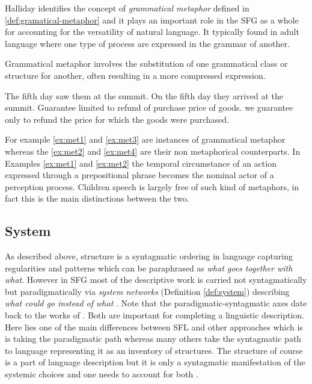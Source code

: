 Halliday identifies the concept of \textit{grammatical metaphor} defined in \ref{def:gramatical-metaphor} and it plays an important role in the SFG as a whole for accounting for the versatility of natural language. It typically found in adult language where one type of process are expressed in the grammar of another.

\begin{definition}\label{def:gramatical-metaphor}
    Grammatical metaphor involves the substitution of one grammatical class or structure for another, often resulting in a more compressed expression.
\end{definition}

\begin{exe}
    \ex\label{ex:met1} The fifth day saw them at the summit.
    \ex\label{ex:met2} On the fifth day they arrived at the summit.
    \ex\label{ex:met3} Guarantee limited to refund of purchase price of goods.
    \ex\label{ex:met4} we guarantee only to refund the price for which the goods were purchased.
\end{exe}

For example \ref{ex:met1} and \ref{ex:met3} are instances of grammatical metaphor whereas the \ref{ex:met2} and \ref{ex:met4} are their non metaphorical counterparts. In Examples \ref{ex:met1} and \ref{ex:met2} the temporal circumstance of an action expressed through a prepositional phrase becomes the nominal actor of a perception process. Children speech is largely free of such kind of metaphors, in fact this is the main distinctions between the two. 

\subsection{System}
\label{sec:system}
As described above, structure is a syntagmatic ordering in language capturing regularities and patterns which can be paraphrased as \textit{what goes together with what}. However in SFG most of the descriptive work is carried not syntagmatically but paradigmatically via \textit{system networks} (Definition \ref{def:system}) describing \textit{what could go instead of what} \citep[22]{Halliday2013}. Note that the paradigmatic-syntagmatic axes date back to the works of \citet{Saussure15}. Both are important for completing a linguistic description. Here lies one of the main differences between SFL and other approaches which is is taking the paradigmatic path whereas many others take the syntagmatic path to language representing it as an inventory of structures. 
The structure of course is a part of language description but it is only a syntagmatic manifestation of the systemic choices and one needs to account for both \citep[23]{Halliday2013}.

